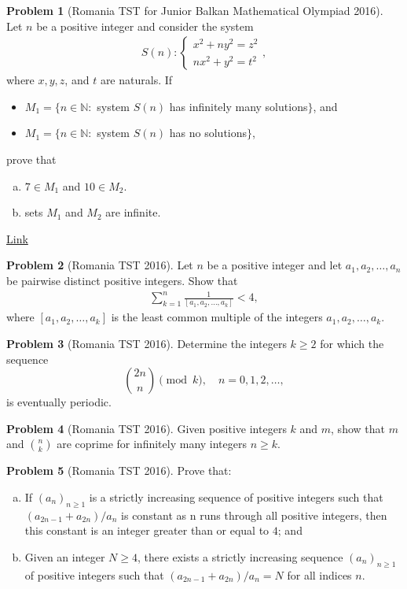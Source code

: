 \documentclass[]{article}
\theoremstyle{definition}
\newtheorem{problem}{Problem}
\begin{document}
\begin{problem}[Romania TST for Junior Balkan Mathematical Olympiad 2016]
	Let $n$ be a positive integer and consider the system
		\begin{align*}
			S(n):\begin{cases}
			x^2+ny^2=z^2\\
			nx^2+y^2=t^2
			\end{cases},
		\end{align*}
	where $x,y,z$, and $t$ are naturals. If
	\begin{itemize}
		\item $M_1=\{n\in\mathbb N:$ system $S(n)$ has infinitely many solutions$\}$, and
		\item $M_1=\{n\in\mathbb N:$ system $S(n)$ has no solutions$\}$,
	\end{itemize}
	prove that
	\begin{enumerate}[(a)]
		\item $7 \in M_1$ and $10 \in M_2$.
		\item sets $M_1$ and $M_2$ are infinite.
	\end{enumerate} 
	\hfill \href{http://artofproblemsolving.com/community/c6h1257390p6509523}{Link}
\end{problem}



\begin{problem}[Romania TST 2016]
	Let $n$ be a positive integer and let $a_1, a_2, \dots, a_n$ be pairwise distinct positive integers. Show that
		\begin{align*}
			\sum_{k=1}^{n} \frac{1}{[a_1, a_2, \dots, a_k]} < 4,
		\end{align*}
	where $[a_1, a_2, \dots, a_k]$ is the least common multiple of the integers $a_1, a_2, \dots, a_k$.
\end{problem}


\begin{problem}[Romania TST 2016]
	Determine the integers $k \geq 2$ for which the sequence$$\binom{2n}{n} \pmod k ,\quad n = 0, 1, 2, \dots,$$ is eventually periodic.
\end{problem}



\begin{problem}[Romania TST 2016]
	Given positive integers $k$ and $m$, show that $m$ and
$\binom{n}{k}$ are coprime for infinitely many integers $n \geq k$.
\end{problem}


\begin{problem}[Romania TST 2016]
	Prove that:
		\begin{enumerate}[(a)]
			\item If $(a_n)_{n\geq 1}$ is a strictly increasing sequence of positive integers such that $(a_{2n−1}+a_{2n})/a_n$ is constant as n runs through all positive integers, then this constant is an integer greater than or equal to $4$; and
			\item Given an integer $N \geq 4$, there exists a strictly increasing sequence $(a_n)_{n\geq 1}$ of positive integers such that $(a_{2n−1}+a_{2n})/a_n=N$ for all indices $n$.
		\end{enumerate}
\end{problem}
\end{document}
